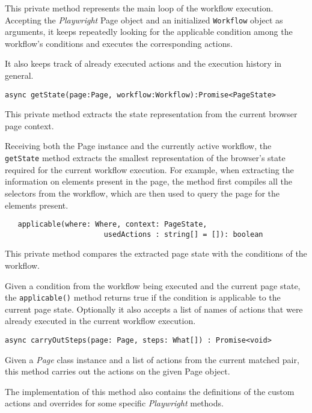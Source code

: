 This private method represents the main loop of the workflow execution.
Accepting the \textit{Playwright} Page object and an initialized \texttt{Workflow} object as arguments,
it keeps repeatedly looking for the applicable condition among the workflow's conditions and executes the corresponding actions.

It also keeps track of already executed actions and the execution history in general.

\emptyline
\verb|async getState(page:Page, workflow:Workflow):Promise<PageState>|

\smallskip

This private method extracts the state representation from the current browser page context.

Receiving both the Page instance and the currently active workflow, the \texttt{getState} method extracts the smallest representation of the browser's state required 
for the current workflow execution. For example, when extracting the information on elements present in the page, the method first compiles all the selectors from the workflow,
which are then used to query the page for the elements present.

\emptyline
\begin{verbatim}   applicable(where: Where, context: PageState, 
                       usedActions : string[] = []): boolean \end{verbatim}

This private method compares the extracted page state with the conditions of the workflow.

Given a condition from the workflow being executed and the current page state, the \texttt{applicable()} method returns true if the condition is applicable to the current page state.
Optionally it also accepts a list of names of actions that were already executed in the current workflow execution.

\emptyline
\verb|async carryOutSteps(page: Page, steps: What[]) : Promise<void>|

\smallskip

Given a \textit{Page} class instance and a list of actions from the current matched pair, this method carries out the actions on the given Page object.

The implementation of this method also contains the definitions of the custom actions and overrides for some specific \textit{Playwright} methods.

